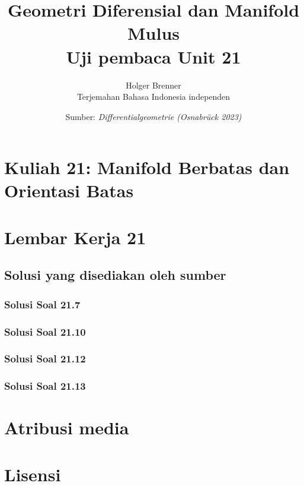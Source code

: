 \documentclass[11pt,a4paper,oneside]{book}
\title{Geometri Diferensial dan Manifold Mulus\\\large Uji pembaca Unit 21}
\author{Holger Brenner\\Terjemahan Bahasa Indonesia independen}
\date{Sumber: \textit{Differentialgeometrie (Osnabr\"uck 2023)}}
\begin{document}
\hypersetup{pageanchor=false}
\maketitle
\hypersetup{pageanchor=true}
\frontmatter
\tableofcontents
\mainmatter
\chapter[Kuliah 21]{Kuliah 21: Manifold Berbatas dan Orientasi Batas}


\chapter{Lembar Kerja 21}


\section*{Solusi yang disediakan oleh sumber}
\subsection*{Solusi Soal 21.7}

\clearpage
\subsection*{Solusi Soal 21.10}

\subsection*{Solusi Soal 21.12}

\subsection*{Solusi Soal 21.13}


\backmatter
\chapter*{Atribusi media}

\chapter*{Lisensi}
\Lizenztext
\end{document}

